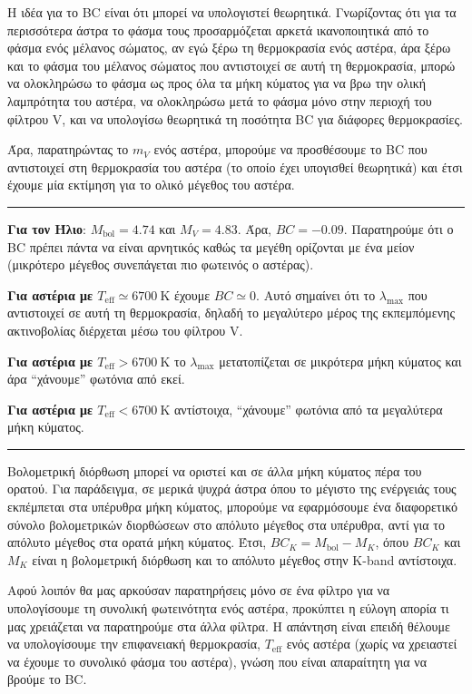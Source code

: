 Η ιδέα για το BC είναι ότι μπορεί να υπολογιστεί θεωρητικά. Γνωρίζοντας ότι για τα περισσότερα άστρα το φάσμα τους προσαρμόζεται αρκετά ικανοποιητικά από το φάσμα ενός μέλανος σώματος, αν εγώ ξέρω τη θερμοκρασία ενός αστέρα, άρα ξέρω και το φάσμα του μέλανος σώματος που αντιστοιχεί σε αυτή τη θερμοκρασία, μπορώ να ολοκληρώσω το φάσμα ως προς όλα τα μήκη κύματος για να βρω την ολική λαμπρότητα του αστέρα, να ολοκληρώσω μετά το φάσμα μόνο στην περιοχή του φίλτρου V, και να υπολογίσω θεωρητικά τη ποσότητα BC για διάφορες θερμοκρασίες.

Άρα, παρατηρώντας το $m_V$ ενός αστέρα, μπορούμε να προσθέσουμε το BC που αντιστοιχεί στη θερμοκρασία του αστέρα (το οποίο έχει υπογισθεί θεωρητικά) και έτσι έχουμε μία εκτίμηση για το ολικό μέγεθος του αστέρα.
\\
{\color{red} \hrule}
\textbf{Για τον Ήλιο}: $M_{\text{bol}} = 4.74$ και $M_V = 4.83$. Άρα, $BC = -0.09$.
Παρατηρούμε ότι ο BC πρέπει πάντα να είναι αρνητικός καθώς τα μεγέθη ορίζονται με ένα μείον (μικρότερο μέγεθος συνεπάγεται πιο φωτεινός ο αστέρας).

\textbf{Για αστέρια με $T_{\text{eff}} \simeq 6700 \ \text{K}$} έχουμε $BC \simeq 0$. Αυτό σημαίνει ότι το $\lambda_{\text{max}}$ που αντιστοιχεί σε αυτή τη θερμοκρασία, δηλαδή το μεγαλύτερο μέρος της εκπεμπόμενης ακτινοβολίας διέρχεται μέσω του φίλτρου V.

\textbf{Για αστέρια με $T_{\text{eff}} > 6700 \ \text{K}$} το $\lambda_{\text{max}}$ μετατοπίζεται σε μικρότερα μήκη κύματος και άρα ``χάνουμε'' φωτόνια από εκεί.

\textbf{Για αστέρια με $T_{\text{eff}} < 6700 \ \text{K}$} αντίστοιχα, ``χάνουμε'' φωτόνια από τα μεγαλύτερα μήκη κύματος.\\
{\color{red} \hrule}

Βολομετρική διόρθωση μπορεί να οριστεί και σε άλλα μήκη κύματος πέρα του ορατού. Για παράδειγμα, σε μερικά ψυχρά άστρα όπου το μέγιστο της ενέργειάς τους εκπέμπεται στα υπέρυθρα μήκη κύματος, μπορούμε να εφαρμόσουμε ένα διαφορετικό σύνολο βολομετρικών διορθώσεων στο απόλυτο μέγεθος στα υπέρυθρα, αντί για το απόλυτο μέγεθος στα ορατά μήκη κύματος. Έτσι, $BC_K = M_{\text{bol}} - M_K$, όπου $BC_K$ και $M_K$ είναι η βολομετρική διόρθωση και το απόλυτο μέγεθος στην K-band αντίστοιχα.  


Αφού λοιπόν θα μας αρκούσαν παρατηρήσεις μόνο σε ένα φίλτρο για να υπολογίσουμε τη συνολική φωτεινότητα ενός αστέρα, προκύπτει η εύλογη απορία τι μας χρειάζεται να παρατηρούμε στα άλλα φίλτρα. Η απάντηση είναι επειδή θέλουμε να υπολογίσουμε την επιφανειακή θερμοκρασία, $T_{\text{eff}}$ ενός αστέρα (χωρίς να χρειαστεί να έχουμε το συνολικό φάσμα του αστέρα), γνώση που είναι απαραίτητη για να βρούμε το BC.

